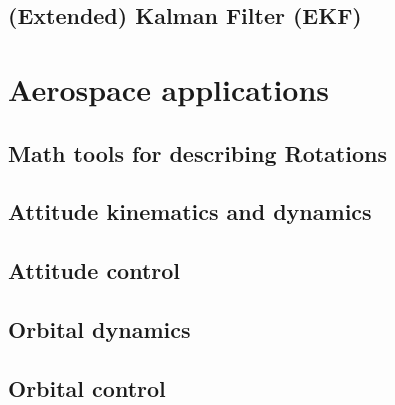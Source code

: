 \documentclass[a4paper, 12pt]{report}
\begin{document}
\chapter{(Extended) Kalman Filter (EKF)}


\part{Aerospace applications}
\chapter{Math tools for describing Rotations}
\chapter{Attitude kinematics and dynamics}
\chapter{Attitude control}
\chapter{Orbital dynamics}
\chapter{Orbital control}
\end{document}
